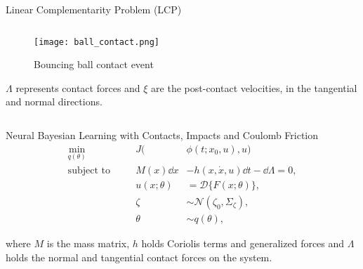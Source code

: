\begin{frame}{Linear Complementarity Problem (LCP)}
\begin{columns}
\begin{column}[]{0.5\linewidth}
            \begin{figure}
                \texttt{[image: ball\_contact.png]}
                    \caption{Bouncing ball contact event}
            \end{figure}
            \vspace{-0.2cm}
            \raggedright $\Lambda$ represents contact forces and $\xi$ are the post-contact velocities, in the tangential and normal directions.

        \end{column}
    \end{columns}
\end{frame}

\begin{frame}
    \begin{exampleblock}{Neural Bayesian Learning with Contacts, Impacts and Coulomb Friction}
        \begin{equation*}
            \begin{aligned}
                \underset{q(\theta) }{\text{min}} 
                &&\quad J(&\phi(t; x_0, u), u) \\
                \text{subject to} 
                &&\quad M(x)\dd x &- h(x, \dot{x}, u) \dd t - \dd \Lambda= 0, \\
                &&\quad u(x; \theta) &= \mathcal{D}\{F(x; \theta)\}, \\
                &&\quad \zeta &\sim \mathcal{N}(\zeta_0, \Sigma_{\zeta}), \\
                &&\quad \theta &\sim q(\theta),
            \end{aligned} 
        \end{equation*}
      \end{exampleblock}
    \raggedright where $M$ is the mass matrix, $h$ holds Coriolis terms and generalized
    forces and $\Lambda$ holds the normal and tangential contact forces on the
    system.
\end{frame}


